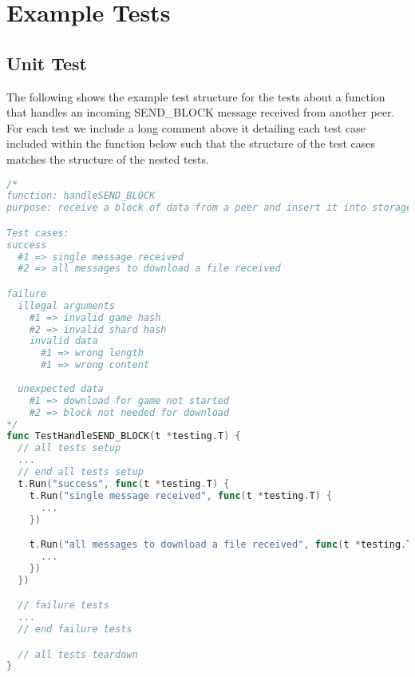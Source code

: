 \section{Example Tests}\label{app:ex-test}

\subsection*{Unit Test}

The following shows the example test structure for the tests about a function that handles an incoming SEND\_BLOCK message received from another peer. For each test we include a long comment above it detailing each test case included within the function below such that the structure of the test cases matches the structure of the nested tests.

\begin{lstlisting}[language=go, caption={An example test case used for the handleSEND\_BLOCK function}]
/*
function: handleSEND_BLOCK
purpose: receive a block of data from a peer and insert it into storage

Test cases:
success
  #1 => single message received
  #2 => all messages to download a file received

failure
  illegal arguments
    #1 => invalid game hash
    #2 => invalid shard hash
    invalid data
      #1 => wrong length
      #1 => wrong content
      
  unexpected data
    #1 => download for game not started
    #2 => block not needed for download
*/
func TestHandleSEND_BLOCK(t *testing.T) {
  // all tests setup
  ...
  // end all tests setup
  t.Run("success", func(t *testing.T) {
    t.Run("single message received", func(t *testing.T) {
      ...
    })

    t.Run("all messages to download a file received", func(t *testing.T) {
      ...
    })
  })

  // failure tests
  ...
  // end failure tests

  // all tests teardown
}
\end{lstlisting}

